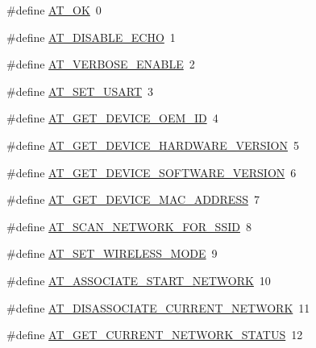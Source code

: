 \begin{DoxyCompactItemize}
\item 
\#define \hyperlink{group__wireless__interface_gae1054bd8e13f49b1cec47249806b8646}{A\+T\+\_\+\+OK}~0
\item 
\#define \hyperlink{group__wireless__interface_ga0c441971a67709773959dbfc80ffe4cf}{A\+T\+\_\+\+D\+I\+S\+A\+B\+L\+E\+\_\+\+E\+C\+HO}~1
\item 
\#define \hyperlink{group__wireless__interface_ga98582418d6cbf4d47215ff705bdc763c}{A\+T\+\_\+\+V\+E\+R\+B\+O\+S\+E\+\_\+\+E\+N\+A\+B\+LE}~2
\item 
\#define \hyperlink{group__wireless__interface_ga211cc8f008c479740ebdbdc6ed3268d8}{A\+T\+\_\+\+S\+E\+T\+\_\+\+U\+S\+A\+RT}~3
\item 
\#define \hyperlink{group__wireless__interface_gade64711d2cf4d2e21661275c63ef576c}{A\+T\+\_\+\+G\+E\+T\+\_\+\+D\+E\+V\+I\+C\+E\+\_\+\+O\+E\+M\+\_\+\+ID}~4
\item 
\#define \hyperlink{group__wireless__interface_ga89649a5f9a7d6de59d20d898dc696410}{A\+T\+\_\+\+G\+E\+T\+\_\+\+D\+E\+V\+I\+C\+E\+\_\+\+H\+A\+R\+D\+W\+A\+R\+E\+\_\+\+V\+E\+R\+S\+I\+ON}~5
\item 
\#define \hyperlink{group__wireless__interface_ga3ac550900ff9217c2f2b4cc7dd2a9355}{A\+T\+\_\+\+G\+E\+T\+\_\+\+D\+E\+V\+I\+C\+E\+\_\+\+S\+O\+F\+T\+W\+A\+R\+E\+\_\+\+V\+E\+R\+S\+I\+ON}~6
\item 
\#define \hyperlink{group__wireless__interface_ga9a60e6ec865436284c5b9bd730107cfe}{A\+T\+\_\+\+G\+E\+T\+\_\+\+D\+E\+V\+I\+C\+E\+\_\+\+M\+A\+C\+\_\+\+A\+D\+D\+R\+E\+SS}~7
\item 
\#define \hyperlink{group__wireless__interface_ga06412789a162ee280a13fe88632a9d13}{A\+T\+\_\+\+S\+C\+A\+N\+\_\+\+N\+E\+T\+W\+O\+R\+K\+\_\+\+F\+O\+R\+\_\+\+S\+S\+ID}~8
\item 
\#define \hyperlink{group__wireless__interface_ga964ba30bd0674f9973865c2dfbb91081}{A\+T\+\_\+\+S\+E\+T\+\_\+\+W\+I\+R\+E\+L\+E\+S\+S\+\_\+\+M\+O\+DE}~9
\item 
\#define \hyperlink{group__wireless__interface_ga4b709b2e783e3b991695a0259678c7e3}{A\+T\+\_\+\+A\+S\+S\+O\+C\+I\+A\+T\+E\+\_\+\+S\+T\+A\+R\+T\+\_\+\+N\+E\+T\+W\+O\+RK}~10
\item 
\#define \hyperlink{group__wireless__interface_gae8db64c60cb195a2cfdc0ea3ae7d9dff}{A\+T\+\_\+\+D\+I\+S\+A\+S\+S\+O\+C\+I\+A\+T\+E\+\_\+\+C\+U\+R\+R\+E\+N\+T\+\_\+\+N\+E\+T\+W\+O\+RK}~11
\item 
\#define \hyperlink{group__wireless__interface_ga0da135023031ce539fa5cc3f4bcc2f06}{A\+T\+\_\+\+G\+E\+T\+\_\+\+C\+U\+R\+R\+E\+N\+T\+\_\+\+N\+E\+T\+W\+O\+R\+K\+\_\+\+S\+T\+A\+T\+US}~12

\end{DoxyCompactItemize}
